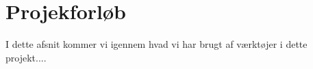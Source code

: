 \section{Projekforløb}
I dette afsnit kommer vi igennem hvad vi har brugt af værktøjer i dette projekt....



